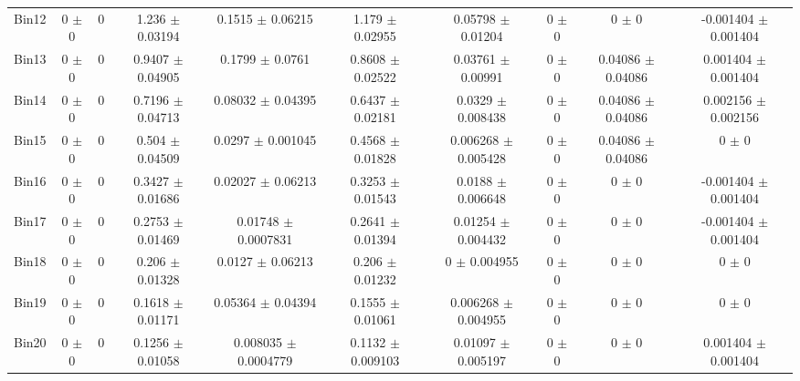 \begin{tabular}{@{\extracolsep{4pt}}lccccccccc@{}}
     Bin12 & 0 $\pm$ 0 & 0 & 1.236 $\pm$ 0.03194 & 0.1515 $\pm$ 0.06215 & 1.179 $\pm$ 0.02955 & 0.05798 $\pm$ 0.01204 & 0 $\pm$ 0 & 0 $\pm$ 0 & -0.001404 $\pm$ 0.001404 \\ 
     Bin13 & 0 $\pm$ 0 & 0 & 0.9407 $\pm$ 0.04905 & 0.1799 $\pm$ 0.0761 & 0.8608 $\pm$ 0.02522 & 0.03761 $\pm$ 0.00991 & 0 $\pm$ 0 & 0.04086 $\pm$ 0.04086 & 0.001404 $\pm$ 0.001404 \\ 
     Bin14 & 0 $\pm$ 0 & 0 & 0.7196 $\pm$ 0.04713 & 0.08032 $\pm$ 0.04395 & 0.6437 $\pm$ 0.02181 & 0.0329 $\pm$ 0.008438 & 0 $\pm$ 0 & 0.04086 $\pm$ 0.04086 & 0.002156 $\pm$ 0.002156 \\ 
     Bin15 & 0 $\pm$ 0 & 0 & 0.504 $\pm$ 0.04509 & 0.0297 $\pm$ 0.001045 & 0.4568 $\pm$ 0.01828 & 0.006268 $\pm$ 0.005428 & 0 $\pm$ 0 & 0.04086 $\pm$ 0.04086 & 0 $\pm$ 0 \\ 
     Bin16 & 0 $\pm$ 0 & 0 & 0.3427 $\pm$ 0.01686 & 0.02027 $\pm$ 0.06213 & 0.3253 $\pm$ 0.01543 & 0.0188 $\pm$ 0.006648 & 0 $\pm$ 0 & 0 $\pm$ 0 & -0.001404 $\pm$ 0.001404 \\ 
     Bin17 & 0 $\pm$ 0 & 0 & 0.2753 $\pm$ 0.01469 & 0.01748 $\pm$ 0.0007831 & 0.2641 $\pm$ 0.01394 & 0.01254 $\pm$ 0.004432 & 0 $\pm$ 0 & 0 $\pm$ 0 & -0.001404 $\pm$ 0.001404 \\ 
     Bin18 & 0 $\pm$ 0 & 0 & 0.206 $\pm$ 0.01328 & 0.0127 $\pm$ 0.06213 & 0.206 $\pm$ 0.01232 & 0 $\pm$ 0.004955 & 0 $\pm$ 0 & 0 $\pm$ 0 & 0 $\pm$ 0 \\ 
     Bin19 & 0 $\pm$ 0 & 0 & 0.1618 $\pm$ 0.01171 & 0.05364 $\pm$ 0.04394 & 0.1555 $\pm$ 0.01061 & 0.006268 $\pm$ 0.004955 & 0 $\pm$ 0 & 0 $\pm$ 0 & 0 $\pm$ 0 \\ 
     Bin20 & 0 $\pm$ 0 & 0 & 0.1256 $\pm$ 0.01058 & 0.008035 $\pm$ 0.0004779 & 0.1132 $\pm$ 0.009103 & 0.01097 $\pm$ 0.005197 & 0 $\pm$ 0 & 0 $\pm$ 0 & 0.001404 $\pm$ 0.001404 \\ 
\hline\hline
  \end{tabular}
